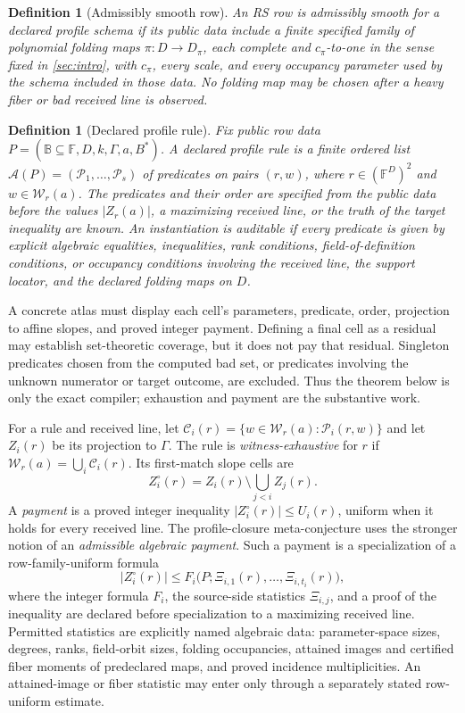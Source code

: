 \documentclass[a4paper,11pt]{amsart}
\newtheorem{definition}[theorem]{Definition}
\theoremstyle{remark}
\newcommand{\F}{\mathbb F}
\newcommand{\B}{\mathbb B}
\newcommand{\Gam}{\Gamma}
\newcommand{\abs}[1]{\lvert#1\rvert}
\begin{document}
\begin{definition}[Admissibly smooth row]\label{def:admissibly-smooth}
An RS row is \emph{admissibly smooth for a declared profile schema} if its
public data include a finite specified family of polynomial folding maps
\(\pi:D\to D_\pi\), each complete and \(c_\pi\)-to-one in the sense fixed
in \cref{sec:intro}, with \(c_\pi\), every scale, and every occupancy
parameter used by the schema included in those data.
No folding map may be chosen after a heavy fiber or bad received line is
observed.
\end{definition}

\begin{definition}[Declared profile rule]\label{def:profile-rule}
Fix public row data \(P=(\B\subseteq\F,D,k,\Gam,a,B^*)\).  A declared profile
rule is a finite ordered list \(\mathcal A(P)=(\mathcal P_1,\ldots,\mathcal
P_s)\) of predicates on pairs \((r,w)\), where \(r\in(\F^D)^2\) and
\(w\in\mathcal W_r(a)\).  The predicates and their order are specified from
the public data before the values \(\abs{Z_r(a)}\), a maximizing received
line, or the truth of the target inequality are known.  An instantiation is
\emph{auditable} if every predicate is given by explicit algebraic equalities,
inequalities, rank conditions, field-of-definition conditions, or occupancy
conditions involving the received line, the support locator, and the declared
folding maps on \(D\).
\end{definition}

A concrete atlas must display each cell's parameters, predicate, order,
projection to affine slopes, and proved integer payment.  Defining a final
cell as a residual may establish set-theoretic coverage, but it does not pay
that residual.  Singleton predicates chosen from the computed bad set, or
predicates involving the unknown numerator or target outcome, are excluded.
Thus the theorem below is only the exact compiler; exhaustion and payment are
the substantive work.

For a rule and received line, let
\(\mathcal C_i(r)=\{w\in\mathcal W_r(a):\mathcal P_i(r,w)\}\) and let
\(Z_i(r)\) be its projection to \(\Gam\).  The rule is
\emph{witness-exhaustive} for \(r\) if
\(\mathcal W_r(a)=\bigcup_i\mathcal C_i(r)\).  Its first-match slope cells are
\[
 Z_i^\circ(r)=Z_i(r)\setminus\bigcup_{j<i}Z_j(r).
\]
A \emph{payment} is a proved integer inequality
\(\abs{Z_i^\circ(r)}\le U_i(r)\), uniform when it holds for every received
line.  The profile-closure meta-conjecture uses the stronger notion of an
\emph{admissible algebraic payment}.  Such a payment is a specialization of a
row-family-uniform formula
\[
 \abs{Z_i^\circ(r)}\le
 F_i\bigl(P;\Xi_{i,1}(r),\ldots,\Xi_{i,t_i}(r)\bigr),
\]
where the integer formula \(F_i\), the source-side statistics \(\Xi_{i,j}\),
and a proof of the inequality are declared before specialization to a
maximizing received line.  Permitted statistics are explicitly named
algebraic data: parameter-space sizes, degrees, ranks, field-orbit sizes,
folding occupancies, attained images and certified fiber moments of
predeclared maps, and proved incidence multiplicities.  An attained-image or
fiber statistic may enter only through a separately stated row-uniform
estimate.
\end{document}
